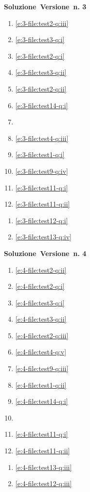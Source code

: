 \begin{minipage}{.33\textwidth}{\large\textbf{Soluzione\ Versione\ n. 3}} 
\begin{enumerate}
\item\ref{e:3-file:test2-q:iii}
\item\ref{e:3-file:test3-q:i}
\item\ref{e:3-file:test2-q:i}
\item\ref{e:3-file:test3-q:ii}
\item\ref{e:3-file:test2-q:ii}
\item\ref{e:3-file:test14-q:i}
\item \makeatletter \makeatother
\item\ref{e:3-file:test4-q:iii}
\item\ref{e:3-file:test1-q:i}
\item\ref{e:3-file:test9-q:iv}
\item\ref{e:3-file:test11-q:i}
\item\ref{e:3-file:test11-q:ii}
\par\end{enumerate}\vspace{3ex}
\begin{enumerate}
\item\ref{e:3-file:test12-q:i}
\item\ref{e:3-file:test13-q:iv}
\par\end{enumerate}\vspace{3ex}
\end{minipage}
\begin{minipage}{.33\textwidth}{\large\textbf{Soluzione\ Versione\ n. 4}} 
\begin{enumerate}
\item\ref{e:4-file:test2-q:ii}
\item\ref{e:4-file:test2-q:i}
\item\ref{e:4-file:test3-q:i}
\item\ref{e:4-file:test3-q:ii}
\item\ref{e:4-file:test2-q:iii}
\item\ref{e:4-file:test4-q:v}
\item\ref{e:4-file:test9-q:iii}
\item\ref{e:4-file:test1-q:ii}
\item\ref{e:4-file:test14-q:i}
\item \makeatletter \makeatother
\item\ref{e:4-file:test11-q:i}
\item\ref{e:4-file:test11-q:ii}
\par\end{enumerate}\vspace{3ex}
\begin{enumerate}
\item\ref{e:4-file:test13-q:iii}
\item\ref{e:4-file:test12-q:iii}
\par\end{enumerate}\vspace{3ex}
\end{minipage}
